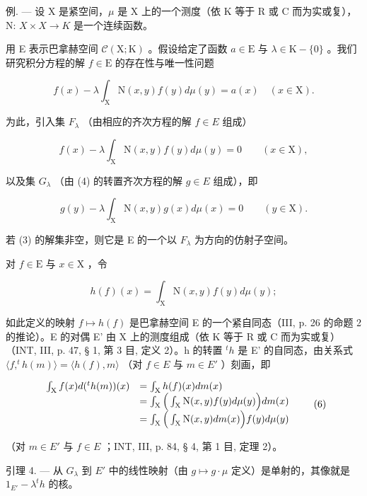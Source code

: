 例. --- 设 X 是紧空间，\(\mu\) 是 X 上的一个测度（依 K 等于 R 或 C 而为实或复），N: \(X \times X \to K\) 是一个连续函数。

用 E 表示巴拿赫空间 \(\mathcal{C}(\mathrm{X};\mathrm{K})\) 。假设给定了函数 \(a\in\mathrm{E}\) 与 \(\lambda\in\mathrm{K}-\{0\}\) 。我们研究积分方程的解 \(f\in\mathrm{E}\) 的存在性与唯一性问题

\[
f (x) - \lambda \int_ {\mathrm{X}} \mathrm{N} (x, y) f (y) d \mu (y) = a (x) \quad (x \in \mathrm{X}).\tag{3}
\]

为此，引入集 \(F_{\lambda}\) （由相应的齐次方程的解 \(f \in E\) 组成）

\[
f (x) - \lambda \int_ {\mathrm{X}} \mathrm{N} (x, y) f (y) d \mu (y) = 0 \qquad (x \in \mathrm{X}),\tag{4}
\]

以及集 \(G_{\lambda}\) （由 (4) 的转置齐次方程的解 \(g \in E\) 组成），即

\[
g (y) - \lambda \int_ {\mathrm{X}} \mathrm{N} (x, y) g (x) d \mu (x) = 0 \qquad (y \in \mathrm{X}).\tag{5}
\]

若 (3) 的解集非空，则它是 E 的一个以 \(F_{\lambda}\) 为方向的仿射子空间。

对 \(f\in \mathrm{E}\) 与 \(x\in \mathrm{X}\) ，令

\[
h (f) (x) = \int_ {\mathrm{X}} \mathrm{N} (x, y) f (y) d \mu (y);
\]

如此定义的映射 \(f \mapsto h(f)\) 是巴拿赫空间 E 的一个紧自同态（III, p. 26 的命题 2 的推论）。E 的对偶 E' 由 X 上的测度组成（依 K 等于 R 或 C 而为实或复）（INT, III, p. 47, § 1, 第 3 目, 定义 2）。h 的转置 \(^{t}h\) 是 E' 的自同态，由关系式 \(\langle f, ^{t}h(m)\rangle = \langle h(f), m\rangle\) （对 \(f \in E\) 与 \(m \in E'\) ）刻画，即

\[
\begin{array}{r l} \int_ {\mathrm{X}} f (x) d (^ {t} h (m)) (x) & = \int_ {\mathrm{X}} h (f) (x) d m (x) \\ & = \int_ {\mathrm{X}} \Big (\int_ {\mathrm{X}} \mathrm{N} (x, y) f (y) d \mu (y) \Big) d m (x) \\ & = \int_ {\mathrm{X}} \Big (\int_ {\mathrm{X}} \mathrm{N} (x, y) d m (x) \Big) f (y) d \mu (y) \end{array}\tag{6}
\]

（对 \(m \in E'\) 与 \(f \in E\) ；INT, III, p. 84, § 4, 第 1 目, 定理 2）。

引理 4. --- 从 \(G_{\lambda}\) 到 \(E'\) 中的线性映射（由 \(g \mapsto g \cdot \mu\) 定义）是单射的，其像就是 \(1_{E'} - \lambda^{t}h\) 的核。

